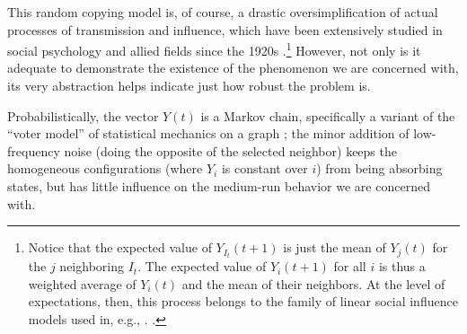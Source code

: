 \documentclass{article}
\begin{document}
\begin{multicols}{2}
This random copying model is, of course, a drastic oversimplification of actual
processes of transmission and influence, which have been extensively studied in
social psychology and allied fields since the 1920s
\citep{Bartlett-remembering, Sperber-explaining,
  Huckfeldt-Johnson-Sprague-political-disagreement,
  Friedkin-social-influence}.\footnote{Notice that the expected value of
  $Y_{I_t}(t+1)$ is just the mean of $Y_j(t)$ for the $j$ neighboring $I_t$.
  The expected value of $Y_{i}(t+1)$ for all $i$ is thus a weighted average of
  $Y_i(t)$ and the mean of their neighbors.  At the level of expectations,
  then, this process belongs to the family of linear social influence models
  used in, e.g.,
  \citet{Friedkin-social-influence}. \label{fn:social-influence-models}.}
However, not only is it adequate to demonstrate the existence of the phenomenon
we are concerned with, its very abstraction helps indicate just how robust the
problem is.

Probabilistically, the vector $Y(t)$ is a Markov chain, specifically a variant
of the ``voter model'' of statistical mechanics on a graph
\citep{Liggett-particle-systems, Sood-Redner-voter-model}; the minor addition
of low-frequency noise (doing the opposite of the selected neighbor) keeps
the homogeneous configurations (where $Y_i$ is constant over $i$) from being
absorbing states, but has little influence on the medium-run behavior we are
concerned with.



\end{multicols}
\end{document}

